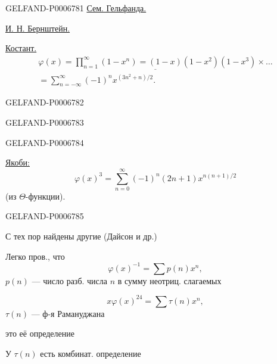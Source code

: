 \begin{GelfandAdjacentEvidence}{GELFAND-P000678}{1}
\underline{Сем. Гельфанда.}

\underline{И. Н. Бернштейн.}

\underline{Костант.}
\[
\begin{aligned}
\underline{\varphi(x)=\prod_{n=1}^{\infty}(1-x^n)
   =(1-x)(1-x^2)(1-x^3)\times\ldots}\\
=\sum_{n=-\infty}^{\infty}(-1)^n x^{(3n^2+n)/2}.
\end{aligned}
\]
\end{GelfandAdjacentEvidence}
\begin{GelfandAdjacentEvidence}{GELFAND-P000678}{2}

\end{GelfandAdjacentEvidence}
\begin{GelfandAdjacentEvidence}{GELFAND-P000678}{3}

\end{GelfandAdjacentEvidence}
\begin{GelfandAdjacentEvidence}{GELFAND-P000678}{4}


\underline{Якоби:}
\[
\varphi(x)^3=\sum_{n=0}^{\infty}(-1)^n(2n+1)x^{n(n+1)/2}
\]
(из \(\Theta\)-функции).
\end{GelfandAdjacentEvidence}
\begin{GelfandAdjacentEvidence}{GELFAND-P000678}{5}


С тех пор найдены другие (Дайсон и др.)


Легко пров., что
\[
\varphi(x)^{-1}=\sum p(n)x^n,
\]
\(p(n)\) --- число разб. числа \(n\) в сумму неотриц. слагаемых

\[
x\varphi(x)^{24}=\sum\tau(n)x^n,
\]
\(\tau(n)\) --- ф-я Рамануджана

это её определение

У \(\tau(n)\) есть комбинат. определение

\end{GelfandAdjacentEvidence}
